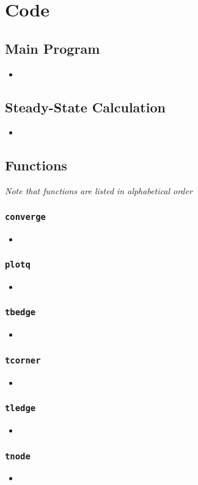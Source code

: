 \documentclass[12pt,letterpaper]{report}
\newcommand{\matlabscript}[2]
{\begin{itemize}\item[]\end{itemize}}
\begin{document}
	\newpage
	\section{Code}
	\subsection{Main Program}
	\matlabscript{ComputerProjectYarmis}{}
	
	\newpage
	\subsection{Steady-State Calculation}
	\matlabscript{MinimizeShort}{}
	
	\newpage
	\subsection{Functions}
	\textit{Note that functions are listed in alphabetical order}
	
	\subsubsection{\texttt{converge}}
	\matlabscript{converge}{}
	
	\subsubsection{\texttt{plotq}}
	\matlabscript{plotq}{}
	
	\subsubsection{\texttt{tbedge}}
	\matlabscript{tbedge}{}
	
	\subsubsection{\texttt{tcorner}}
	\matlabscript{tcorner}{}
	
	\subsubsection{\texttt{tledge}}
	\matlabscript{tledge}{}
	
	\subsubsection{\texttt{tnode}}
	\matlabscript{tnode}{}


	
	
	
\end{document}
